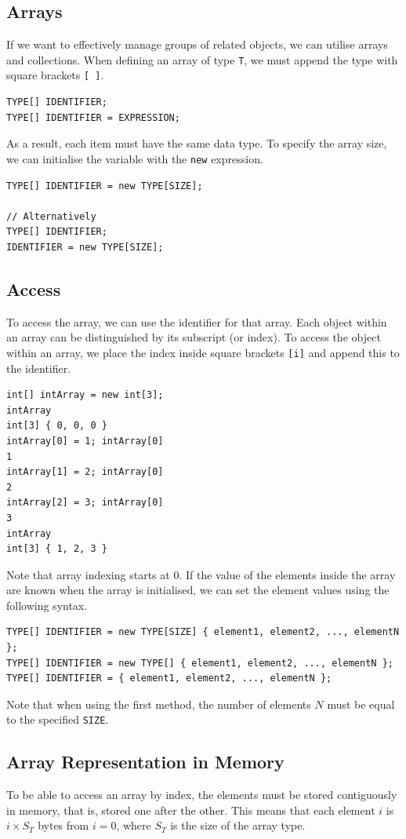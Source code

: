 \documentclass{article}
\def\customlinemarker#1#2{
    \edef\thelstnumber{%
        \unexpanded{%
            \ifnum#1=\value{lstnumber}\relax
              #2%
            \fi}%
        \ifx\thelstnumber\relax\else
        \expandafter\unexpanded\expandafter{\thelstnumber}%
        \fi
    }
}
\begin{document}
\subsection{Arrays}
If we want to effectively manage groups of related objects, we can utilise arrays and collections.
When defining an array of type \lstinline{T}, we must append the type with square brackets \lstinline{[ ]}.
\begin{lstlisting}[numbers=none]
TYPE[] IDENTIFIER;
TYPE[] IDENTIFIER = EXPRESSION;
\end{lstlisting}
As a result, each item must have the same data type. To specify the array size, we can initialise
the variable with the \lstinline{new} expression.
\begin{lstlisting}[numbers=none]
TYPE[] IDENTIFIER = new TYPE[SIZE];

// Alternatively
TYPE[] IDENTIFIER;
IDENTIFIER = new TYPE[SIZE];
\end{lstlisting}
\subsection{Access}
To access the array, we can use the identifier for that array. Each object within
an array can be distinguished by its subscript (or index). To access the object within
an array, we place the index inside square brackets \lstinline{[i]} and append this to the
identifier.
\begingroup
\let\thelstnumber\relax
\customlinemarker{1}{\$}
\customlinemarker{2}{\$}
\customlinemarker{4}{\$}
\customlinemarker{6}{\$}
\customlinemarker{8}{\$}
\customlinemarker{10}{\$}
\begin{lstlisting}
int[] intArray = new int[3]; 
intArray
int[3] { 0, 0, 0 }
intArray[0] = 1; intArray[0]
1
intArray[1] = 2; intArray[0]
2
intArray[2] = 3; intArray[0]
3
intArray
int[3] { 1, 2, 3 }
\end{lstlisting}
\endgroup
Note that array indexing starts at 0. If the value of the elements inside the array
are known when the array is initialised, we can set the element values using the following syntax.
\begin{lstlisting}[numbers=none]
TYPE[] IDENTIFIER = new TYPE[SIZE] { element1, element2, ..., elementN };
TYPE[] IDENTIFIER = new TYPE[] { element1, element2, ..., elementN };
TYPE[] IDENTIFIER = { element1, element2, ..., elementN };
\end{lstlisting}
Note that when using the first method, the number of elements \(N\) must be equal to the specified \lstinline{SIZE}. %
\subsection{Array Representation in Memory}
To be able to access an array by index, the elements must be stored contiguously in memory, that is,
stored one after the other. This means that each element \(i\) is \(i \times S_T\) bytes from \(i = 0\),
where \(S_T\) is the size of the array type.
\end{document}
